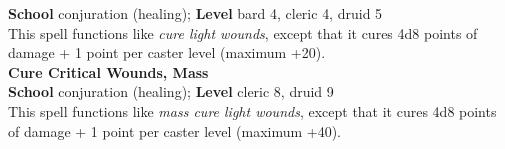 \textbf{School} conjuration (healing); \textbf{Level} bard 4, cleric 4, druid 5\\
This spell functions like \textit{cure light wounds}, except that it cures 4d8 points of damage + 1 point per caster level (maximum +20).\\
\textbf{Cure Critical Wounds, Mass}\\
\textbf{School} conjuration (healing); \textbf{Level} cleric 8, druid 9\\
This spell functions like \textit{mass cure light wounds}, except that it cures 4d8 points of damage + 1 point per caster level (maximum +40).\\

